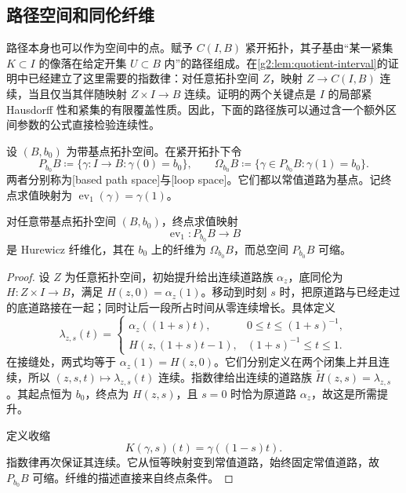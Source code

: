 \subsection{路径空间和同伦纤维}
\label{g2:subsec:0802:02}

路径本身也可以作为空间中的点。赋予 \(C(I,B)\) 紧开拓扑，其子基由“某一紧集 \(K\subset I\) 的像落在给定开集 \(U\subset B\) 内”的路径组成。在\cref{g2:lem:quotient-interval}的证明中已经建立了这里需要的指数律：对任意拓扑空间 \(Z\)，映射 \(Z\rightarrow C(I,B)\) 连续，当且仅当其伴随映射 \(Z\times I\rightarrow B\) 连续。证明的两个关键点是 \(I\) 的局部紧 Hausdorff 性和紧集的有限覆盖性质。因此，下面的路径族可以通过含一个额外区间参数的公式直接检验连续性。

\begin{definition}[基点道路空间与回路空间]\label{g2:def:path-loop-space}
	设 \((B,b_0)\) 为带基点拓扑空间。在紧开拓扑下令
	\[
		P_{b_0}B\coloneqq\{\gamma:I\rightarrow B:\gamma(0)=b_0\},\qquad
		\Omega_{b_0}B\coloneqq\{\gamma\in P_{b_0}B:\gamma(1)=b_0\}.
	\]
	两者分别称为[based path space]与[loop space]。它们都以常值道路为基点。记终点求值映射为 \(\operatorname{ev}_1(\gamma)=\gamma(1)\)。
\end{definition}

\begin{proposition}\label{g2:prop:path-fibration}
	对任意带基点拓扑空间 \((B,b_0)\)，终点求值映射
	\[
		\operatorname{ev}_1:P_{b_0}B\longrightarrow B
	\]
	是 Hurewicz 纤维化，其在 \(b_0\) 上的纤维为 \(\Omega_{b_0}B\)，而总空间 \(P_{b_0}B\) 可缩。
\end{proposition}
\begin{proof}
	设 \(Z\) 为任意拓扑空间，初始提升给出连续道路族 \(\alpha_z\)，底同伦为 \(H:Z\times I\rightarrow B\)，满足 \(H(z,0)=\alpha_z(1)\)。移动到时刻 \(s\) 时，把原道路与已经走过的底道路接在一起；同时让后一段所占时间从零连续增长。具体定义
	\[
		\lambda_{z,s}(t)=
		\begin{cases}
			\alpha_z((1+s)t),&0\le t\le(1+s)^{-1},\\
			H(z,(1+s)t-1),&(1+s)^{-1}\le t\le1.
		\end{cases}
	\]
	在接缝处，两式均等于 \(\alpha_z(1)=H(z,0)\)。它们分别定义在两个闭集上并且连续，所以 \((z,s,t)\mapsto\lambda_{z,s}(t)\) 连续。指数律给出连续的道路族 \(\widetilde H(z,s)=\lambda_{z,s}\)。其起点恒为 \(b_0\)，终点为 \(H(z,s)\)，且 \(s=0\) 时恰为原道路 \(\alpha_z\)，故这是所需提升。

	定义收缩
	\[
		K(\gamma,s)(t)=\gamma((1-s)t).
	\]
	指数律再次保证其连续。它从恒等映射变到常值道路，始终固定常值道路，故 \(P_{b_0}B\) 可缩。纤维的描述直接来自终点条件。
\end{proof}

